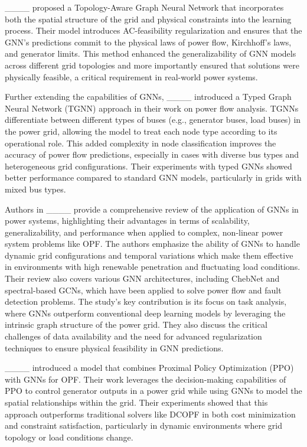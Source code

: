 ____ proposed a Topology-Aware Graph Neural Network that incorporates both the spatial structure of the grid and physical constraints into the learning process. Their model introduces AC-feasibility regularization and ensures that the GNN’s predictions commit to the physical laws of power flow, Kirchhoff’s laws, and generator limits. This method enhanced the generalizability of GNN models across different grid topologies and more importantly ensured that solutions were physically feasible, a critical requirement in real-world power systems.

Further extending the capabilities of GNNs, ____ introduced a Typed Graph Neural Network (TGNN) approach in their work on power flow analysis. TGNNs differentiate between different types of buses (e.g., generator buses, load buses) in the power grid, allowing the model to treat each node type according to its operational role. This added complexity in node classification improves the accuracy of power flow predictions, especially in cases with diverse bus types and heterogeneous grid configurations. Their experiments with typed GNNs showed better performance compared to standard GNN models, particularly in grids with mixed bus types.

Authors in ____ provide a comprehensive review of the application of GNNs in power systems, highlighting their advantages in terms of scalability, generalizability, and performance when applied to complex, non-linear power system problems like OPF. The authors emphasize the ability of GNNs to handle dynamic grid configurations and temporal variations which make them effective in environments with high renewable penetration and fluctuating load conditions. Their review also covers various GNN architectures, including ChebNet and spectral-based GCNs, which have been applied to solve power flow and fault detection problems. The study’s key contribution is its focus on task analysis, where GNNs outperform conventional deep learning models by leveraging the intrinsic graph structure of the power grid. They also discuss the critical challenges of data availability and the need for advanced regularization techniques to ensure physical feasibility in GNN predictions.

____ introduced a model that combines Proximal Policy Optimization (PPO) with GNNs for OPF. Their work leverages the decision-making capabilities of PPO to control generator outputs in a power grid while using GNNs to model the spatial relationships within the grid. Their experiments showed that this approach outperforms traditional solvers like DCOPF in both cost minimization and constraint satisfaction, particularly in dynamic environments where grid topology or load conditions change.

